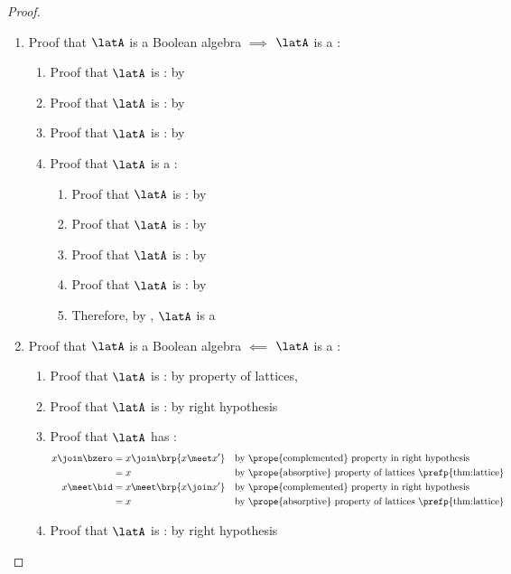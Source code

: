 \begin{proof}
\begin{enumerate}
  \item Proof that $\latA$ is a Boolean algebra $\implies$   $\latA$ is a   :
    \begin{enumerate}
      \item Proof that $\latA$ is : by 
      \item Proof that $\latA$ is : by 
      \item Proof that $\latA$ is :      by 
      \item Proof that $\latA$ is a :
        \begin{enumerate}
          \item Proof that $\latA$ is :   by 
          \item Proof that $\latA$ is :  by 
          \item Proof that $\latA$ is :  by 
          \item Proof that $\latA$ is :   by 
          \item Therefore, by , $\latA$ is a 
        \end{enumerate}
    \end{enumerate}

  \item Proof that $\latA$ is a Boolean algebra $\impliedby$ $\latA$ is a   :
    \begin{enumerate}
      \item Proof that $\latA$ is :  by property of lattices, 
      \item Proof that $\latA$ is : by right hypothesis
      \item Proof that $\latA$ has :
        \begin{align*}
          x \join \bzero
            &= x \join \brp{x \meet x'}
            && \text{by \prope{complemented} property in right hypothesis}
          \\&= x
            && \text{by \prope{absorptive} property of lattices \prefp{thm:lattice}}
          \\
          x \meet \bid
            &= x \meet \brp{x \join x'}
            && \text{by \prope{complemented} property in right hypothesis}
          \\&= x
            && \text{by \prope{absorptive} property of lattices \prefp{thm:lattice}}
        \end{align*}
      \item Proof that $\latA$ is : by right hypothesis
    \end{enumerate}
\end{enumerate}
\end{proof}





